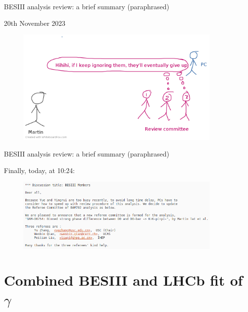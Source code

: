 \documentclass{beamer}
\begin{document}
\begin{frame}{BESIII analysis review: a brief summary (paraphrased)}
  \begin{center}
    {\large 20th November 2023\phantom{p}}
  \end{center}
  \begin{figure}
    \includegraphics[width=0.9\textwidth,trim={0 0 0 0.5cm},clip=true]{Plots/BESIII_review_process_13.png}
  \end{figure}
\end{frame}

\begin{frame}{BESIII analysis review: a brief summary (paraphrased)}
  \begin{center}
    {\large Finally, today, at 10:24:}
  \end{center}
  \begin{figure}
    \includegraphics[width=0.9\textwidth]{Plots/PC_email_newRC.png}
  \end{figure}
\end{frame}

\section{Combined BESIII and LHCb fit of \texorpdfstring{$\gamma$}{gamma}}
\end{document}
